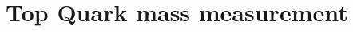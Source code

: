 \chapter{Top Quark mass measurement}
\label{c:top_mass_analysis}
\ifpdf
    \graphicspath{{05_Mass_analysis/plots/}}
\else
    \graphicspath{{05_Mass_analysis/plots/EPS/}{05_Mass_analysis/plots/}}
\fi



